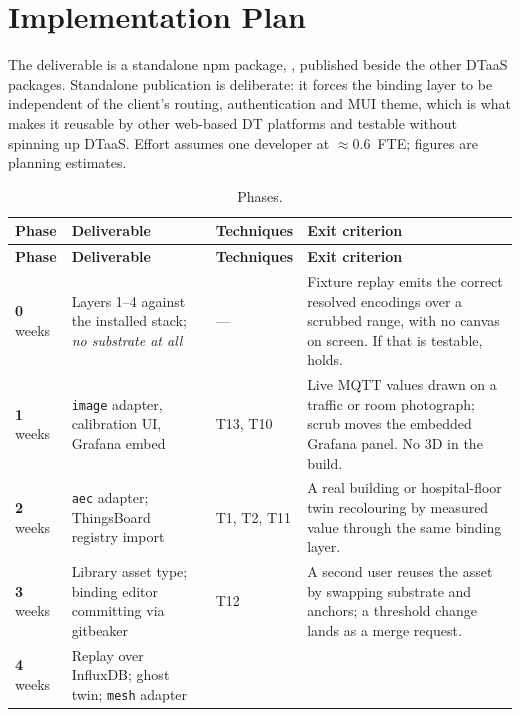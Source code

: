 \section{Implementation Plan}
\label{sec:implementation}

The deliverable is a standalone npm package,
, published beside the other DTaaS
packages. Standalone publication is deliberate: it forces the binding layer to be
independent of the client's routing, authentication and MUI theme, which is what makes
it reusable by other web-based DT platforms and testable without spinning up DTaaS.
Effort assumes one developer at $\approx$0.6~FTE; figures are planning estimates.

\begin{longtable}{@{}L{1.9cm}L{4.6cm}L{1.9cm}L{6.4cm}@{}}
\caption{Phases.}\label{tab:phases}\\
\toprule
\textbf{Phase} & \textbf{Deliverable} & \textbf{Techniques} & \textbf{Exit criterion} \\
\midrule
\endfirsthead
\toprule
\textbf{Phase} & \textbf{Deliverable} & \textbf{Techniques} & \textbf{Exit criterion} \\
\midrule
\endhead
\textbf{0}  weeks & Layers 1--4 against the installed stack; \emph{no
substrate at all} & --- & Fixture replay emits the correct resolved encodings over a
scrubbed range, with no canvas on screen. If that is testable,  holds. \\
\addlinespace
\textbf{1}  weeks & \texttt{image} adapter, calibration UI, Grafana embed &
T13, T10 & Live MQTT values drawn on a traffic or room photograph; scrub moves the
embedded Grafana panel. No 3D in the build. \\
\addlinespace
\textbf{2}  weeks & \texttt{aec} adapter; ThingsBoard registry import & T1,
T2, T11 & A real building or hospital-floor twin recolouring by measured value through
the same binding layer. \\
\addlinespace
\textbf{3}  weeks & Library asset type; binding editor committing via
gitbeaker & T12 & A second user reuses the asset by swapping substrate and anchors; a
threshold change lands as a merge request. \\
\addlinespace
\textbf{4}  weeks & Replay over InfluxDB; ghost twin; \texttt{mesh} adapter &

\end{longtable}
